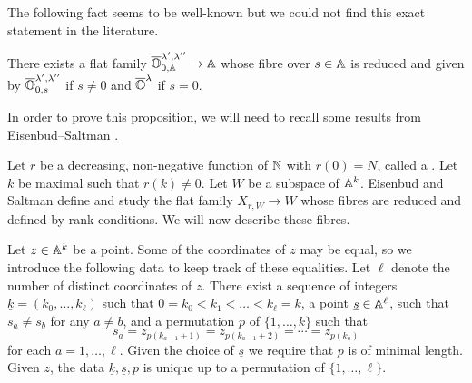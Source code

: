 \documentclass{article}
\begin{document}
The following fact seems to be well-known but we could not find this exact statement in the literature.
\begin{proposition} 
    \label{prop:adjoint}
    There exists a flat family $\overline{\OO}^{\lambda', \lambda''}_{0,\AA} \rightarrow \AA$ whose fibre over $s \in \AA$ is reduced and given by $\overline{\OO}^{\lambda', \lambda''}_{0,s}$ if $s \ne 0 $ and $\overline{\OO}^\lambda $ if $ s = 0$.
\end{proposition}
% 
In order to prove this proposition, we will need to recall some results from Eisenbud--Saltman \cite{eisenbud1989rank}. 
% 

Let $ r $ be a decreasing, non-negative function of $\NN$ with $r(0) = N$, called a .  Let $k $ be maximal such that $ r(k) \ne 0 $.
% 
Let $ W$ be a subspace of $ \AA^k$. Eisenbud and Saltman define and study the flat family $ X_{r,W} \rightarrow W$ whose fibres are reduced and defined by rank conditions. We will now describe these fibres. 

Let $ z \in \AA^k$ be a point. Some of the coordinates of $z$ may be equal, so we introduce the following data to keep track of these equalities. Let $ \ell$ denote the number of distinct coordinates of $ z $. There exist a sequence of integers $\underline{k} = (k_0,\dots,k_\ell)$ such that $ 0=k_0< k_1< \dots < k_\ell = k $, a point $ \underline s \in\AA^\ell$, such that $s_a\ne s_b$ for any $a\ne b$, and a permutation  $ p $ of $ \{1, \dots, k\}$ such that 
$$ 
    s_a = z_{p(k_{a-1}+1)} = z_{p(k_{a-1} + 2)} =  \cdots = z_{p(k_a)}
$$ 
for each $a = 1,\dots,\ell$. 
Given the choice of $ \underline s$ we require that $ p $ is of minimal length. 
Given $z$, the data $\underline{k}, \underline s, p$ is unique up to a permutation of $ \{1, \dots, \ell\}$.
% 
\end{document}
